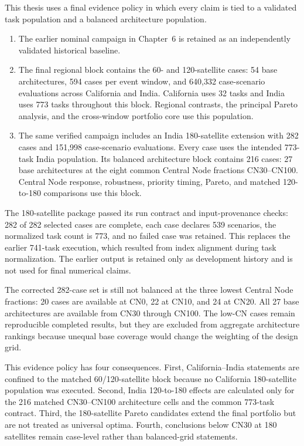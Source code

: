 This thesis uses a final evidence policy in which every claim is tied to a validated task population and a balanced architecture population.

\begin{enumerate}
\item The earlier nominal campaign in Chapter~6 is retained as an independently validated historical baseline.
\item The final regional block contains the 60- and 120-satellite cases: 54 base architectures, 594 cases per event window, and 640,332 case-scenario evaluations across California and India. California uses 32 tasks and India uses 773 tasks throughout this block. Regional contrasts, the principal Pareto analysis, and the cross-window portfolio core use this population.
\item The same verified campaign includes an India 180-satellite extension with 282 cases and 151,998 case-scenario evaluations. Every case uses the intended 773-task India population. Its balanced architecture block contains 216 cases: 27 base architectures at the eight common Central Node fractions CN30--CN100. Central Node response, robustness, priority timing, Pareto, and matched 120-to-180 comparisons use this block.
\end{enumerate}

The 180-satellite package passed its run contract and input-provenance checks: 282 of 282 selected cases are complete, each case declares 539 scenarios, the normalized task count is 773, and no failed case was retained. This replaces the earlier 741-task execution, which resulted from index alignment during task normalization. The earlier output is retained only as development history and is not used for final numerical claims.

The corrected 282-case set is still not balanced at the three lowest Central Node fractions: 20 cases are available at CN0, 22 at CN10, and 24 at CN20. All 27 base architectures are available from CN30 through CN100. The low-CN cases remain reproducible completed results, but they are excluded from aggregate architecture rankings because unequal base coverage would change the weighting of the design grid.

This evidence policy has four consequences. First, California--India statements are confined to the matched 60/120-satellite block because no California 180-satellite population was executed. Second, India 120-to-180 effects are calculated only for the 216 matched CN30--CN100 architecture cells and the common 773-task contract. Third, the 180-satellite Pareto candidates extend the final portfolio but are not treated as universal optima. Fourth, conclusions below CN30 at 180 satellites remain case-level rather than balanced-grid statements.

